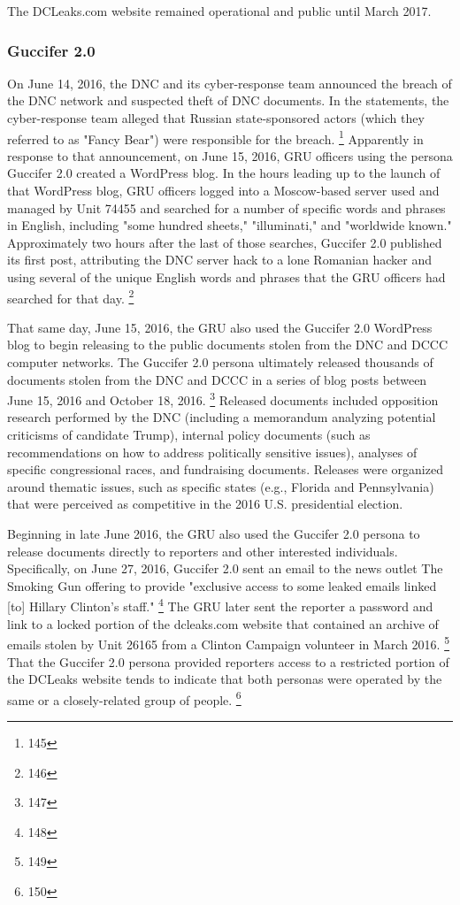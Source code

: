 The DCLeaks.com website remained operational and public until March 2017.

\subsubsection{Guccifer 2.0}

On June 14, 2016, the DNC and its cyber-response team announced the breach of the DNC network and suspected theft of DNC documents.
In the statements, the cyber-response team alleged that Russian state-sponsored actors (which they referred to as "Fancy Bear") were responsible for the breach.%
\footnote{145}
Apparently in response to that announcement, on June 15, 2016, GRU officers using the persona Guccifer 2.0 created a WordPress blog.
In the hours leading up to the launch of that WordPress blog, GRU officers logged into a Moscow-based server used and managed by Unit 74455 and searched for a number of specific words and phrases in English, including "some hundred sheets," "illuminati," and "worldwide known."
Approximately two hours after the last of those searches, Guccifer 2.0 published its first post, attributing the DNC server hack to a lone Romanian hacker and using several of the unique English words and phrases that the GRU officers had searched for that day.%
\footnote{146}

That same day, June 15, 2016, the GRU also used the Guccifer 2.0 WordPress blog to begin releasing to the public documents stolen from the DNC and DCCC computer networks.
The Guccifer 2.0 persona ultimately released thousands of documents stolen from the DNC and DCCC in a series of blog posts between June 15, 2016 and October 18, 2016.%
\footnote{147}
Released documents included opposition research performed by the DNC (including a memorandum analyzing potential criticisms of candidate Trump), internal policy documents (such as recommendations on how to address politically sensitive issues), analyses of specific congressional races, and fundraising documents.
Releases were organized around thematic issues, such as specific states (e.g., Florida and Pennsylvania) that were perceived as competitive in the 2016 U.S. presidential election.

Beginning in late June 2016, the GRU also used the Guccifer 2.0 persona to release documents directly to reporters and other interested individuals.
Specifically, on June 27, 2016, Guccifer 2.0 sent an email to the news outlet The Smoking Gun offering to provide "exclusive access to some leaked emails linked [to] Hillary Clinton's staff."%
\footnote{148}
The GRU later sent the reporter a password and link to a locked portion of the dcleaks.com website that contained an archive of emails stolen by Unit 26165 from a Clinton Campaign volunteer in March 2016.%
\footnote{149}
That the Guccifer 2.0 persona provided reporters access to a restricted portion of the DCLeaks website tends to indicate that both personas were operated by the same or a  closely-related group of people.%
\footnote{150}

